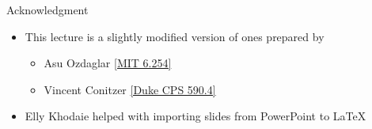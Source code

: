 \documentclass[11pt,aspectratio=169]{beamer}
\begin{document}
  
  \begin{frame}{Acknowledgment}
   \begin{itemize}
   \setlength{\itemsep}{1em}
    \item This lecture is a slightly modified version of ones prepared by
    \begin{itemize}
     \item Asu Ozdaglar \href{https://ocw.mit.edu/courses/electrical-engineering-and-computer-science/6-254-game-theory-with-engineering-applications-spring-2010/index.htm}{[MIT 6.254]}
     \item Vincent Conitzer \href{https://courses.cs.duke.edu/spring16/compsci590.4/}{[Duke CPS 590.4]}
    \end{itemize}
    \item Elly Khodaie helped with importing slides from PowerPoint to \LaTeX
   \end{itemize}
  \end{frame}
\end{document}
